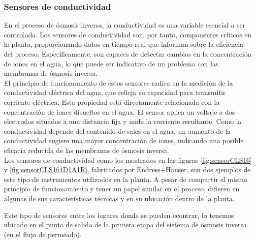 \subsubsection{Sensores de conductividad}

En el proceso de ósmosis inversa, la conductividad es una variable esencial a ser controlada. Los sensores de 
conductividad son, por tanto, componentes críticos en la planta, proporcionando datos en tiempo real que informan 
sobre la eficiencia del proceso. Específicamente, son capaces de detectar cambios en la concentración de iones 
en el agua, lo que puede ser indicativo de un problema con las membranas de ósmosis inversa.\\

El principio de funcionamiento de estos sensores radica en la medición de la conductividad eléctrica del agua, 
que refleja su capacidad para transmitir corriente eléctrica. Esta propiedad está directamente relacionada 
con la concentración de iones disueltos en el agua. El sensor aplica un voltaje a dos electrodos situados a una 
distancia fija y mide la corriente resultante. Como la conductividad depende del contenido de sales en el agua, 
un aumento de la conductividad sugiere una mayor concentración de iones, indicando una posible eficacia reducida 
de las membranas de ósmosis inversa.\\

Los sensores de conductividad como los mostrados en las figuras \ref{fig:sensorCLS16} y \ref{fig:sensorCLS164D1A1R}, fabricados por Endress+Hauser, son dos ejemplos de este tipo de 
instrumentos utilizados en la planta. A pesar de compartir el mismo principio de funcionamiento y tener un papel 
similar en el proceso, difieren en algunas de sus características técnicas y en su ubicación dentro de la planta.\\


Este tipo de sensores entre los lugares donde se pueden econtrar, lo tenemos ubicado en el punto de salida de la primera 
etapa del sistema de ósmosis inversa (en el flujo de permeado).\\


